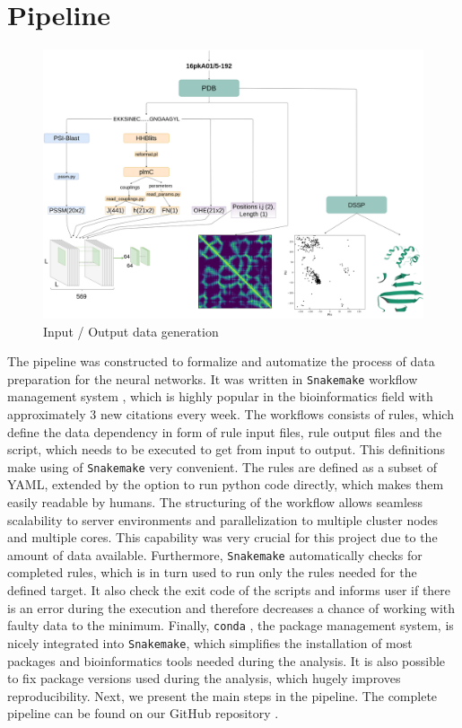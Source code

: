 \section{Pipeline}

\begin{figure}
    \centering
    \includegraphics[width=\linewidth]{imgs_tomas/pipeline_input.png}
    \caption{Input / Output data generation}
    \label{fig:pipeline_input}
\end{figure}

The pipeline was constructed to formalize and automatize the process of data preparation for the neural networks.
It was written in \texttt{Snakemake} workflow management system \cite{koster2012snakemake}, which is highly popular in the bioinformatics field with approximately 3 new citations every week.
The workflows consists of rules, which define the data dependency in form of rule input files, rule output files and the script, which needs to be executed to get from input to output. 
This definitions make using of \texttt{Snakemake} very convenient.
The rules are defined as a subset of YAML, extended by the option to run python code directly, which makes them easily readable by humans.
The structuring of the workflow allows seamless scalability to server environments and parallelization to multiple cluster nodes and multiple cores.
This capability was very crucial for this project due to the amount of data available.
Furthermore, \texttt{Snakemake} automatically checks for completed rules, which is in turn used to run only the rules needed for the defined target.
It also check the exit code of the scripts and informs user if there is an error during the execution and therefore decreases a chance of working with faulty data to the minimum.
Finally, \texttt{conda} \cite{conda}, the package management system, is nicely integrated into \texttt{Snakemake}, which simplifies the installation of most packages and bioinformatics tools needed during the analysis.
It is also possible to fix package versions used during the analysis, which hugely improves reproducibility.
Next, we present the main steps in the pipeline.
The complete pipeline can be found on our GitHub repository \cite{github}.

